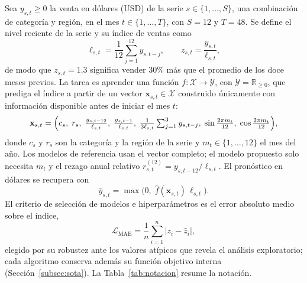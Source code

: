 \documentclass[pdflatex,sn-mathphys-num]{sn-jnl}
\begin{document}
Sea $y_{s,t}\ge 0$ la venta en dólares (USD) de la serie $s\in\{1,\dots,S\}$, una combinación de categoría y región, en el mes $t\in\{1,\dots,T\}$, con $S=12$ y $T=48$. Se define el nivel reciente de la serie y su índice de ventas como
\begin{equation}
\ell_{s,t}=\frac{1}{12}\sum_{j=1}^{12}y_{s,t-j},\qquad z_{s,t}=\frac{y_{s,t}}{\ell_{s,t}},
\label{eq:indice}
\end{equation}
de modo que $z_{s,t}=1.3$ significa vender 30\% más que el promedio de los doce meses previos. La tarea es aprender una función $f:\mathcal{X}\to\mathcal{Y}$, con $\mathcal{Y}=\mathbb{R}_{\ge 0}$, que prediga el índice a partir de un vector $\mathbf{x}_{s,t}\in\mathcal{X}$ construido únicamente con información disponible antes de iniciar el mes $t$:
\begin{equation}
\mathbf{x}_{s,t}=\Bigl(c_s,\;r_s,\;\tfrac{y_{s,t-12}}{\ell_{s,t}},\;\tfrac{y_{s,t-1}}{\ell_{s,t}},\;\tfrac{1}{3\ell_{s,t}}\textstyle\sum_{j=1}^{3}y_{s,t-j},\;\sin\tfrac{2\pi m_t}{12},\;\cos\tfrac{2\pi m_t}{12}\Bigr),
\label{eq:x}
\end{equation}
donde $c_s$ y $r_s$ son la categoría y la región de la serie y $m_t\in\{1,\dots,12\}$ el mes del año. Los modelos de referencia usan el vector completo; el modelo propuesto solo necesita $m_t$ y el rezago anual relativo $r^{(12)}_{s,t}=y_{s,t-12}/\ell_{s,t}$. El pronóstico en dólares se recupera con
\begin{equation}
\hat{y}_{s,t}=\max\bigl(0,\;\hat{f}(\mathbf{x}_{s,t})\,\ell_{s,t}\bigr).
\label{eq:retorno}
\end{equation}
El criterio de selección de modelos e hiperparámetros es el error absoluto medio sobre el índice,
\begin{equation}
\mathcal{L}_{\mathrm{MAE}}=\frac{1}{n}\sum_{i=1}^{n}\bigl|z_i-\hat{z}_i\bigr|,
\label{eq:perdida}
\end{equation}
elegido por su robustez ante los valores atípicos que revela el análisis exploratorio; cada algoritmo conserva además su función objetivo interna (Sección~\ref{subsec:sota}). La Tabla~\ref{tab:notacion} resume la notación.
\end{document}
